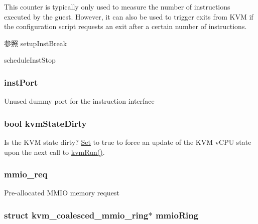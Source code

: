 This counter is typically only used to measure the number of instructions executed by the guest. However, it can also be used to trigger exits from KVM if the configuration script requests an exit after a certain number of instructions.

\begin{DoxySeeAlso}{参照}
setupInstBreak 

scheduleInstStop 
\end{DoxySeeAlso}
\hypertarget{classBaseKvmCPU_a3d1157769fdf1f3b9566f70b9e7c30ea}{
\subsubsection[{instPort}]{ {\bf instPort}}}
\label{classBaseKvmCPU_a3d1157769fdf1f3b9566f70b9e7c30ea}
Unused dummy port for the instruction interface \hypertarget{classBaseKvmCPU_a32fdccc14987171c2381947096c363f1}{
\subsubsection[{kvmStateDirty}]{\setlength{\rightskip}{0pt plus 5cm}bool {\bf kvmStateDirty}}}
\label{classBaseKvmCPU_a32fdccc14987171c2381947096c363f1}
Is the KVM state dirty? \hyperlink{classSet}{Set} to true to force an update of the KVM vCPU state upon the next call to \hyperlink{classBaseKvmCPU_aed3dbd0c0bf26d82ee56367a3f350506}{kvmRun()}. \hypertarget{classBaseKvmCPU_a22caf021a7ece8d92e5ab612191b1b57}{
\subsubsection[{mmio\_\-req}]{ {\bf mmio\_\-req}}}
\label{classBaseKvmCPU_a22caf021a7ece8d92e5ab612191b1b57}
Pre-\/allocated MMIO memory request \hypertarget{classBaseKvmCPU_ad4e1bcd3f032d2921aa97aec1fc7a45c}{
\subsubsection[{mmioRing}]{\setlength{\rightskip}{0pt plus 5cm}struct kvm\_\-coalesced\_\-mmio\_\-ring$\ast$ {\bf mmioRing}}}
